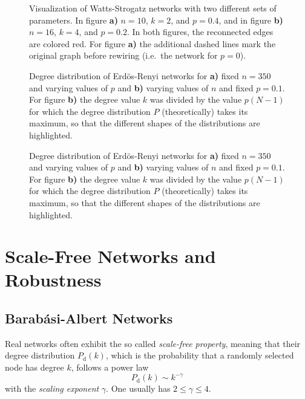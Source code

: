 \documentclass{scrartcl}
\begin{document}
\begin{figure}
    \centering
    \def\svgwidth{0.8\columnwidth}
    
    \caption{Visualization of Watts-Strogatz networks with two different
        sets of parameters. In figure \textbf{a)} $n=10$, $k=2$, and
        $p=0.4$, and in figure \textbf{b)} $n=16$, $k=4$, and $p=0.2$. In
        both figures, the reconnected edges are colored red. For figure
        \textbf{a)} the additional dashed lines mark the original graph
    before rewiring (i.e.\ the network for $p=0$).}
    \label{13_ws}
\end{figure}

\begin{figure}
    \caption{Degree distribution of Erdös-Renyi networks for \textbf{a)}
    fixed $n=350$ and varying values of $p$ and \textbf{b)} varying values
    of $n$ and fixed $p=0.1$. For figure \textbf{b)} the degree value $k$ was
    divided by the value $p(N-1)$ for which the degree distribution $P$
    (theoretically) takes its maximum, so that the different shapes of the
    distributions are highlighted.}
\end{figure}


\begin{figure}
    \caption{Degree distribution of Erdös-Renyi networks for \textbf{a)}
    fixed $n=350$ and varying values of $p$ and \textbf{b)} varying values
    of $n$ and fixed $p=0.1$. For figure \textbf{b)} the degree value $k$ was
    divided by the value $p(N-1)$ for which the degree distribution $P$
    (theoretically) takes its maximum, so that the different shapes of the
    distributions are highlighted.}
\end{figure}

\clearpage
\section{Scale-Free Networks and Robustness}
\subsection{Barab\'asi-Albert Networks}
Real networks often exhibit the so called \emph{scale-free property},
meaning that their degree distribution $P_\mathrm{d}(k)$, which is the probability
that a randomly selected node has degree $k$, follows a power law
\begin{equation}
    P_\mathrm{d}(k) \sim k^{-\gamma}
\end{equation}
with the \emph{scaling exponent} $\gamma$. One usually has $2 \le \gamma \le 4$.
\end{document}
